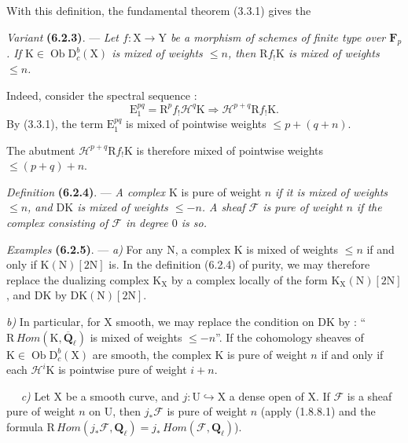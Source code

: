 \documentclass[11pt,leqno]{article}
\newcommand{\Page}[1]{\ifvmode\noindent\else\unskip\ \fi{\footnotesize\textcolor{gray}{[p.\,#1]}}\ \ignorespaces}
\begin{document}
With this definition, the fundamental theorem (3.3.1) gives the

\textit{Variant} \textbf{(6.2.3)}. — \textit{Let
\(f:\mathrm{X}\to\mathrm{Y}\) be a morphism of schemes of finite type
over \(\mathbf{F}_p\). If
\(\mathrm{K}\in\operatorname{Ob}\mathrm{D}_c^b(\mathrm{X})\) is
mixed of weights \(\leq n\), then \(\mathrm{R}f_!\mathrm{K}\) is
mixed of weights \(\leq n\).}

Indeed, consider the spectral sequence :
\[
\mathrm{E}_1^{pq}=\mathrm{R}^pf_!\mathscr{H}^q\mathrm{K}
\Rightarrow\mathscr{H}^{p+q}\mathrm{R}f_!\mathrm{K}.
\]
By (3.3.1), the term \(\mathrm{E}_1^{pq}\) is mixed of pointwise
weights \(\leq p+(q+n)\).

The abutment \(\mathscr{H}^{p+q}\mathrm{R}f_!\mathrm{K}\) is
therefore mixed of pointwise weights \(\leq(p+q)+n\).

\textit{Definition} \textbf{(6.2.4)}. — \textit{A complex
\(\mathrm{K}\)} is pure of weight \(n\) \textit{if it is mixed of
weights \(\leq n\), and \(\mathrm{D}\mathrm{K}\) is mixed of
weights \(\leq-n\). A sheaf \(\mathscr{F}\) is pure of weight
\(n\) if the complex consisting of \(\mathscr{F}\) in degree \(0\) is so.}

\textit{Examples} \textbf{(6.2.5)}. — \textit{a)} For any
\(\mathrm{N}\), a complex \(\mathrm{K}\) is mixed of weights
\(\leq n\) if and only if \(\mathrm{K}(\mathrm{N})[2\mathrm{N}]\)
is. In the definition (6.2.4) of purity, we may therefore replace
the dualizing complex \(\mathrm{K}_{\mathrm{X}}\) by a complex
locally of the form \(\mathrm{K}_{\mathrm{X}}(\mathrm{N})[2\mathrm{N}]\),
and \(\mathrm{D}\mathrm{K}\) by
\(\mathrm{D}\mathrm{K}(\mathrm{N})[2\mathrm{N}]\).

\textit{b)} In particular, for \(\mathrm{X}\) smooth, we may
replace the condition on \(\mathrm{D}\mathrm{K}\) by :
“\(\mathrm{R}\,\mathit{Hom}(\mathrm{K},\overline{\mathbf{Q}}_\ell)\)
is mixed of weights \(\leq-n\)”. If the cohomology sheaves of
\(\mathrm{K}\in\operatorname{Ob}\mathrm{D}_c^b(\mathrm{X})\) are
smooth, the complex \(\mathrm{K}\) is pure of weight \(n\) if and
only if each \(\mathscr{H}^i\mathrm{K}\) is pointwise
pure of weight \(i+n\).

\Page{248}
\textit{c)} Let \(\mathrm{X}\) be a smooth curve, and
\(j:\mathrm{U}\hookrightarrow\mathrm{X}\) a dense open of
\(\mathrm{X}\). If \(\mathscr{F}\) is a sheaf pure of weight
\(n\) on \(\mathrm{U}\), then \(j_*\mathscr{F}\) is pure of weight
\(n\) (apply (1.8.8.1) and the formula
\(\mathrm{R}\,\mathit{Hom}(j_*\mathscr{F},\mathbf{Q}_\ell)
=j_*\,\mathit{Hom}(\mathscr{F},\mathbf{Q}_\ell)\)).
\end{document}
